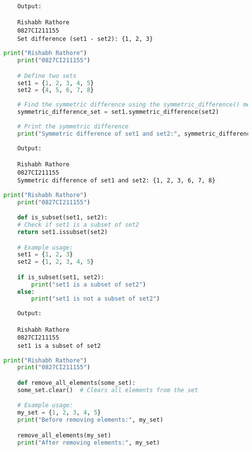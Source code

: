 \documentclass{report}
\begin{document}
\begin{verbatim}
	Output:

	Rishabh Rathore
	0827CI211155
	Set difference (set1 - set2): {1, 2, 3}

\end{verbatim}


\bigskip


\sol 
\begin{lstlisting}[language=Python]
	print("Rishabh Rathore")
	print("0827CI211155")

	# Define two sets
	set1 = {1, 2, 3, 4, 5}
	set2 = {4, 5, 6, 7, 8}
	
	# Find the symmetric difference using the symmetric_difference() method
	symmetric_difference_set = set1.symmetric_difference(set2)
	
	# Print the symmetric difference
	print("Symmetric difference of set1 and set2:", symmetric_difference_set)
\end{lstlisting}

\begin{verbatim}
	Output:

	Rishabh Rathore
	0827CI211155
	Symmetric difference of set1 and set2: {1, 2, 3, 6, 7, 8}
\end{verbatim}


\bigskip


\sol 
\begin{lstlisting}[language=Python]
	print("Rishabh Rathore")
	print("0827CI211155")

	def is_subset(set1, set2):
    # Check if set1 is a subset of set2
    return set1.issubset(set2)

	# Example usage:
	set1 = {1, 2, 3}
	set2 = {1, 2, 3, 4, 5}

	if is_subset(set1, set2):
		print("set1 is a subset of set2")
	else:
		print("set1 is not a subset of set2")
\end{lstlisting}

\begin{verbatim}
	Output:

	Rishabh Rathore
	0827CI211155
	set1 is a subset of set2

\end{verbatim}


\bigskip


\sol 
\begin{lstlisting}[language=Python]
	print("Rishabh Rathore")
	print("0827CI211155")

	def remove_all_elements(some_set):
    some_set.clear()  # Clears all elements from the set

	# Example usage:
	my_set = {1, 2, 3, 4, 5}
	print("Before removing elements:", my_set)

	remove_all_elements(my_set)
	print("After removing elements:", my_set)
\end{lstlisting}
\end{document}
